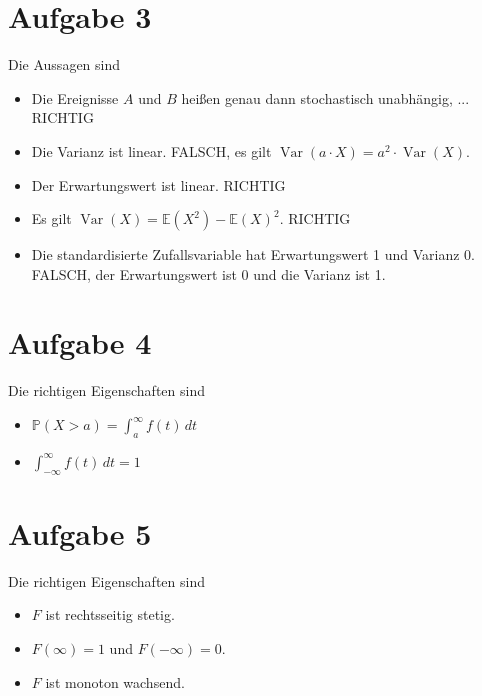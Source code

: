 \documentclass{article}
\DeclareMathOperator{\Var}{Var}
\newcommand{\E}{\mathbb{E}}
\begin{document}
	\section*{Aufgabe 3}
	Die Aussagen sind
	\begin{itemize}
		\item Die Ereignisse $A$ und $B$ heißen genau dann stochastisch unabhängig, ... RICHTIG
		\item Die Varianz ist linear. FALSCH, es gilt $\Var(a\cdot X) = a^2\cdot\Var(X)$.
		\item Der Erwartungswert ist linear. RICHTIG
		\item Es gilt $\Var(X)=\E(X^2)-\E(X)^2$. RICHTIG
		\item Die standardisierte Zufallsvariable hat Erwartungswert 1 und Varianz 0. FALSCH, der Erwartungswert ist 0 und die Varianz ist 1.
	\end{itemize}

	\section*{Aufgabe 4}
	Die richtigen Eigenschaften sind
	\begin{itemize}
		\item $\mathbb{P}(X>a)=\int_a^{\infty} f(t)\,dt$
		\item $\int_{-\infty}^{\infty} f(t)\, dt=1$
	\end{itemize}

	\section*{Aufgabe 5}
	Die richtigen Eigenschaften sind
	\begin{itemize}
		\item $F$ ist rechtsseitig stetig.
		\item $F(\infty)=1$ und $F(-\infty)=0$.
		\item $F$ ist monoton wachsend.
	\end{itemize}
	
\end{document}
